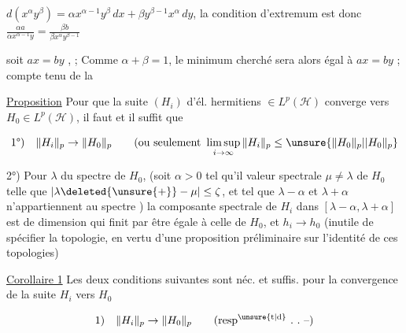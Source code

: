  $d(x^\alpha y^\beta)=\alpha x^{\alpha-1}y^\beta\,dx+\beta y^{\beta-1}x^\alpha\,dy$,
la condition d'extremum est donc $\frac{\alpha a}{\alpha x^{\alpha-1}y}=\frac{\beta b}{\beta x^\alpha y^{\beta-1}}$

soit $ax=by$ \deleted{\unsure{$=$}},   ;  Comme $\alpha+\beta=1$, le minimum cherché sera alors  égal à $ax=by$ ; compte tenu de la 

\uline{Proposition} Pour que la suite $(H_i)$ d'él. hermitiens $\in L^p(\mathscr H)$ converge vers $H_0\in L^p(\mathscr H)$, il faut et il suffit que

\[
\text{1°)}\quad\|H_i\|_p\to\|H_0\|_p\qquad
\text{(ou seulement }\limsup_{i\to\infty}\|H_i\|_p\leq\unsure{\|H_0\|_p|\lvert H_0\|_p}
\]

2°) Pour  $\lambda$ du spectre de $H_0$, (soit $\alpha>0$ tel qu'il  valeur spectrale $\mu\neq\lambda$ de $H_0$ telle que $|\lambda\deleted{\unsure{+}}-\mu|\leq\zeta$,   et tel que $\lambda-\alpha$ et $\lambda+\alpha$ n'appartiennent au spectre )  la composante spectrale de $H_i$  dans $[\lambda-\alpha,\lambda+\alpha]$ est de dimension  qui finit par être égale à celle de $H_0$, et $h_i\to h_0$ (inutile de spécifier la topologie, en vertu d'une proposition préliminaire sur l'identité de  ces topologies)


\uline{Corollaire 1} Les deux conditions suivantes sont néc. et suffis.  pour la convergence de la suite $H_i$ vers $H_0$

\[
\text{1)}\quad\|H_i\|_p\to\|H_0\|_p\qquad\text{(resp$^{\unsure{\mathrm t|\mathrm d}}$ .\ .\ --)}
\]

